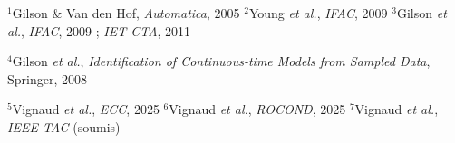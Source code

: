 \documentclass{style/presentation}
\begin{document}
\begin{frame}
    \vspace{-5mm}
    \begin{center}
        \resizebox{\linewidth}{!}{}
    \end{center}
    \vfill
    {\footnotesize\color{gray}
        $^1$Gilson \& Van den Hof, \emph{Automatica}, 2005 \quad
        $^2$Young \emph{et al.}, \emph{IFAC}, 2009 \quad
        $^3$Gilson \emph{et al.}, \emph{IFAC}, 2009 ; \emph{IET CTA}, 2011\par
        $^4$Gilson \emph{et al.}, \emph{Identification of Continuous-time Models from Sampled Data}, Springer, 2008\par
        {\color{alerted text.fg!80!black}%
            $^5$Vignaud \emph{et al.}, \emph{ECC}, 2025 \quad
            $^6$Vignaud \emph{et al.}, \emph{ROCOND}, 2025 \quad
            $^7$Vignaud \emph{et al.}, \emph{IEEE TAC} (soumis)}\par}


\end{frame}
\end{document}
